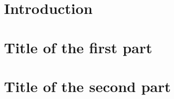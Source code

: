 \documentclass[%
    paper=B5, %
    twoside=true,           %
    openright,              %
    chapterprefix=true,     %
    10pt,                   %
    headings=normal,        %
    bibliography=totoc,     %
    listof=totoc,           %
    titlepage=on,           %
    captions=tableabove,    %
    chapterprefix=false,    %
    appendixprefix=false,   %
    draft=false,            %
]{scrreprt}%
\begin{document}


\pagestyle{empty}				%
\cleardoublepage

\setcounter{tocdepth}{1}		%
\tableofcontents				%
\cleardoublepage
%
\cleardoublepage
%
\pagestyle{plain}				%

\setcounter{page}{1}			%
\pagestyle{scrheadings}			%

\part{Introduction}                 %

\part{Title of the first part}
\label{part:first}

\part{Title of the second part}
\label{part:second}
\end{document}
